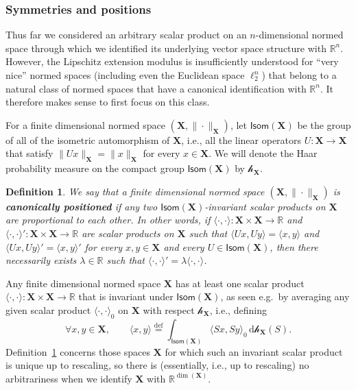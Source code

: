 \documentclass[11pt,reqno]{amsart}
\newcommand{\ud}[0]{\,\mathrm{d}}
\newcommand{\X}{\mathbf X}
\newcommand{\R}{\mathbb R}
\newtheorem{definition}[theorem]{Definition}
\theoremstyle{remark}
\newcommand{\eqdef}{\stackrel{\mathrm{def}}{=}}
\renewcommand{\1}{\mathbf 1}
\begin{document}
\subsubsection{Symmetries and positions}\label{sec:positions} Thus far we considered an arbitrary  scalar product on an $n$-dimensional normed space through which we identified its underlying vector space structure with $\R^n$.  However, the Lipschitz extension modulus is insufficiently understood for  ``very nice'' normed spaces (including even the Euclidean space $\ell_2^n$) that belong to a natural class of normed spaces that have a canonical identification with $\R^n$. It therefore makes sense to first focus on this class.


For a finite dimensional normed space $(\X,\|\cdot\|_\X)$, let $\mathsf{Isom}(\X)$ be the group of all of the isometric automorphism of $\X$, i.e., all the linear operators $U:\X\to \X$ that satisfy $\|Ux\|_{\X}=\|x\|_{\X}$ for every $x\in \X$. We will denote  the Haar probability measure  on the compact group $\mathsf{Isom}(\X)$ by $\mathcal{h}_\X$.



\begin{definition}\label{def:canonical position} We say that a finite dimensional  normed space $(\X,\|\cdot\|_\X)$ is {\bf \em canonically positioned} if any two $\mathsf{Isom}(\X)$-invariant scalar products on $\X$ are proportional to each other. In other words, if $\langle\cdot,\cdot\rangle:\X\times \X\to \R$ and $\langle\cdot,\cdot\rangle':\X\times \X\to \R$ are scalar products on $\X$ such that $\langle Ux,Uy\rangle =\langle x,y\rangle$ and $\langle Ux,Uy\rangle' =\langle x,y\rangle'$ for every $x,y\in \X$ and every $U\in \mathsf{Isom}(\X)$, then there necessarily exists $\lambda\in \R$ such that $\langle \cdot,\cdot \rangle'=\lambda \langle \cdot,\cdot\rangle$.
\end{definition}
Any finite dimensional normed space $\X$ has at least one scalar product $\langle \cdot,\cdot\rangle:\X\times \X\to \R$ that is  invariant under $\mathsf{Isom}(\X)$, as  seen e.g.~by averaging any given scalar product $\langle\cdot,\cdot\rangle_0$ on $\X$ with respect $\mathcal{h}_\X$, i.e., defining
$$
\forall x,y\in \X,\qquad \langle x,y\rangle \eqdef \int_{\mathsf{Isom}(\X) } \langle Sx,Sy\rangle_0 \ud\mathcal{h}_\X(S).
$$
Definition~\ref{def:canonical position} concerns those spaces $\X$ for which such an invariant scalar product is unique up to rescaling, so there is (essentially, i.e., up to rescaling) no arbitrariness when we identify $\X$ with $\R^{\dim(\X)}$.
\end{document}
